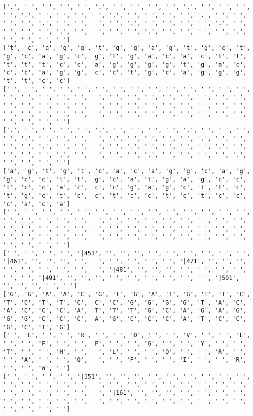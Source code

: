 \documentclass{article}
\begin{document}
\begin{Verbatim}
['.', ' ', ' ', ' ', ' ', '.', ' ', ' ', ' ', ' ', '.', ' ', ' ', ' ', ' ', '.', ' ', ' ', ' ', ' ', '.', ' ', ' ', ' ', ' ', '.', ' ', ' ', ' ', ' ', '.', ' ', ' ', ' ', ' ', '.', ' ', ' ', ' ', ' ', '.', ' ', ' ', ' ', ' ', '.', ' ', ' ', ' ', ' ', '.', ' ', ' ', ' ', ' ', '.', ' ', ' ', ' ', ' ']
['t', 'c', 'a', 'g', 'g', 't', 'g', 'g', 'a', 'g', 't', 'g', 'c', 't', 'g', 'c', 'a', 'g', 'c', 'g', 't', 'g', 'a', 'c', 'a', 'c', 't', 't', 't', 't', 't', 'c', 'c', 'a', 'g', 'g', 'g', 'g', 't', 'g', 'a', 'c', 'c', 'c', 'a', 'g', 'g', 'c', 'c', 't', 'g', 'c', 'a', 'g', 'g', 'g', 't', 't', 'c', 'c']
[' ', ' ', ' ', ' ', ' ', ' ', ' ', ' ', ' ', ' ', ' ', ' ', ' ', ' ', ' ', ' ', ' ', ' ', ' ', ' ', ' ', ' ', ' ', ' ', ' ', ' ', ' ', ' ', ' ', ' ', ' ', ' ', ' ', ' ', ' ', ' ', ' ', ' ', ' ', ' ', ' ', ' ', ' ', ' ', ' ', ' ', ' ', ' ', ' ', ' ', ' ', ' ', ' ', ' ', ' ', ' ', ' ', ' ', ' ', ' ']
['.', ' ', ' ', ' ', ' ', '.', ' ', ' ', ' ', ' ', '.', ' ', ' ', ' ', ' ', '.', ' ', ' ', ' ', ' ', '.', ' ', ' ', ' ', ' ', '.', ' ', ' ', ' ', ' ', '.', ' ', ' ', ' ', ' ', '.', ' ', ' ', ' ', ' ', '.', ' ', ' ', ' ', ' ', '.', ' ', ' ', ' ', ' ', '.', ' ', ' ', ' ', ' ', '.', ' ', ' ', ' ', ' ']
['a', 'g', 't', 'g', 't', 'c', 'a', 'c', 'a', 'g', 'g', 'c', 'a', 'g', 'g', 'c', 'c', 't', 't', 'g', 'c', 'a', 't', 'g', 'a', 'g', 'c', 'c', 't', 'c', 'c', 'a', 'c', 'c', 'c', 'g', 'a', 'g', 'c', 't', 't', 'c', 't', 'g', 'c', 't', 'c', 'c', 't', 'c', 'c', 't', 'c', 't', 'c', 'c', 'c', 'a', 'c', 'a']
[' ', ' ', ' ', ' ', ' ', ' ', ' ', ' ', ' ', ' ', ' ', ' ', ' ', ' ', ' ', ' ', ' ', ' ', ' ', ' ', ' ', ' ', ' ', ' ', ' ', ' ', ' ', ' ', ' ', ' ', ' ', ' ', ' ', ' ', ' ', ' ', ' ', ' ', ' ', ' ', ' ', ' ', ' ', ' ', ' ', ' ', ' ', ' ', ' ', ' ', ' ', ' ', ' ', ' ', ' ', ' ', ' ', ' ', ' ', ' ']
[' ', ' ', ' ', ' ', '|451', '', '', '', ' ', ' ', ' ', ' ', ' ', ' ', '|461', '', '', '', ' ', ' ', ' ', ' ', ' ', ' ', '|471', '', '', '', ' ', ' ', ' ', ' ', ' ', ' ', '|481', '', '', '', ' ', ' ', ' ', ' ', ' ', ' ', '|491', '', '', '', ' ', ' ', ' ', ' ', ' ', ' ', '|501', '', '', '', ' ', ' ']
['G', 'G', 'A', 'A', 'C', 'G', 'T', 'G', 'A', 'T', 'G', 'T', 'T', 'C', 'T', 'C', 'T', 'T', 'C', 'C', 'C', 'G', 'G', 'G', 'G', 'T', 'A', 'C', 'A', 'C', 'C', 'C', 'A', 'T', 'T', 'T', 'G', 'C', 'A', 'G', 'A', 'G', 'G', 'G', 'C', 'C', 'C', 'A', 'G', 'C', 'C', 'C', 'A', 'T', 'C', 'C', 'G', 'C', 'T', 'G']
[' ', 'E', ' ', ' ', 'R', ' ', ' ', 'D', ' ', ' ', 'V', ' ', ' ', 'L', ' ', ' ', 'F', ' ', ' ', 'P', ' ', ' ', 'G', ' ', ' ', 'Y', ' ', ' ', 'T', ' ', ' ', 'H', ' ', ' ', 'L', ' ', ' ', 'Q', ' ', ' ', 'R', ' ', ' ', 'A', ' ', ' ', 'Q', ' ', ' ', 'P', ' ', ' ', 'I', ' ', ' ', 'R', ' ', ' ', 'W', ' ']
[' ', ' ', ' ', ' ', '|151', '', '', '', ' ', ' ', ' ', ' ', ' ', ' ', ' ', ' ', ' ', ' ', ' ', ' ', ' ', ' ', ' ', ' ', ' ', ' ', ' ', ' ', ' ', ' ', ' ', ' ', ' ', ' ', '|161', '', '', '', ' ', ' ', ' ', ' ', ' ', ' ', ' ', ' ', ' ', ' ', ' ', ' ', ' ', ' ', ' ', ' ', ' ', ' ', ' ', ' ', ' ', ' ']
  

\end{Verbatim}
\end{document}
